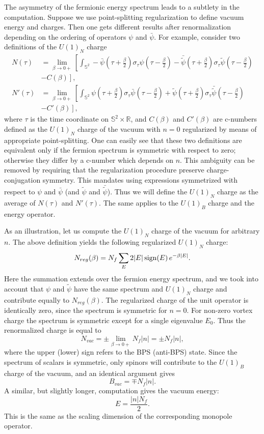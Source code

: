 \documentclass[a4paper,12pt, amsfonts, amssymb]{article}
\newcommand{\RR}{{\mathbb R}}
\renewcommand{\SS}{{\mathbb S}}
\newcommand{\ra}{\rightarrow}
\newcommand{\tpsi}{{\tilde \psi}}
\newcommand{\bpsi}{{\bar \psi}}
\begin{document}
The asymmetry of the fermionic energy spectrum leads to a subtlety in the
computation.
Suppose we use point-splitting regularization to define vacuum energy and
charges. Then one gets different results after renormalization depending
on the ordering of operators $\psi$ and $\bpsi$. For example, consider 
two definitions of the $U(1)_N$ charge
\begin{align*}
N(\tau)&=\lim_{\beta\ra 0+} \left[\int_{\SS^2} 
-\bpsi\left(\tau+\frac{\beta}{2}\right)\sigma_\tau 
\psi\left(\tau-\frac{\beta}{2}\right) - 
{\bar\tpsi}\left(\tau+\frac{\beta}{2}\right)\sigma_\tau 
\tpsi\left(\tau-\frac{\beta}{2}\right)\right.\\
&\left. -C(\beta)\right],\\ 
N'(\tau)&=\lim_{\beta\ra 0+} \left[\int_{\SS^2} \psi\left(\tau+\frac{\beta}{2}\right)\sigma_\tau
\bpsi(\tau-\frac{\beta}{2})
+\tpsi\left(\tau+\frac{\beta}{2}\right)\sigma_\tau
{\bar\tpsi}\left(\tau-\frac{\beta}{2}\right)\right.\\ 
&\left. -C'(\beta)\right],
\end{align*}
where $\tau$ is the time coordinate on $\SS^2\times\RR$, and $C(\beta)$ and
$C'(\beta)$ are c-numbers defined as the $U(1)_N$ charge of the vacuum with $n=0$ regularized by means of appropriate point-splitting. 
One can easily 
see that these two definitions are equivalent only if the fermion spectrum
is symmetric with respect to zero; otherwise they differ by a c-number
which depends on $n$. This ambiguity can be removed by requiring that
the regularization procedure preserve charge-conjugation symmetry. 
This mandates using expressions symmetrized with respect to $\psi$ and $\bpsi$
(and $\tpsi$ and $\bar{\tpsi}$).
Thus we will define the $U(1)_N$ charge as the average of $N(\tau)$ and
$N'(\tau)$. The same applies to the $U(1)_B$ charge and the energy operator. 

As an illustration, let us compute the $U(1)_N$ charge of the vacuum for
arbitrary $n$.
The above definition yields the following regularized $U(1)_N$ charge:
\begin{equation}\label{Nreg}
N_{reg}(\beta)=N_f \sum_{E} 2|E|\, {\rm sign}(E)\, e^{-\beta \vert E\vert}.
\end{equation}
Here the summation extends over the fermion energy spectrum, and
we took into account that $\psi$ and $\tpsi$ have the same spectrum and
$U(1)_N$ charge and contribute equally to $N_{reg}(\beta).$
The regularized charge of the unit operator is identically zero,
since the spectrum is symmetric for $n=0$. For non-zero vortex charge the spectrum is symmetric except for a single eigenvalue $E_0$. 
Thus the renormalized charge is equal to 
$$
N_{vac}=\pm \lim_{\beta\ra 0+} N_f |n|=\pm N_f|n|,
$$
where the upper (lower) sign refers to the BPS (anti-BPS) state.
Since the spectrum of scalars is symmetric, only spinors will contribute
to the $U(1)_B$ charge of the vacuum, and an identical argument gives
$$
B_{vac}=\mp N_f|n|.
$$
A similar, but slightly longer, computation gives the vacuum energy:
$$
E=\frac{|n|N_f}{2}.
$$
This is the same as the scaling dimension of the corresponding monopole
operator.
\end{document}
